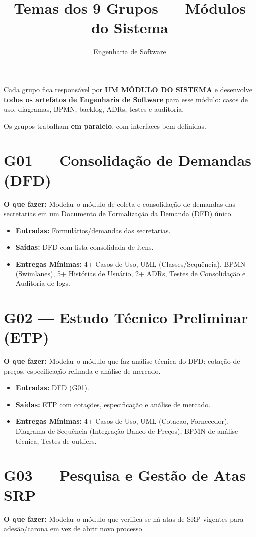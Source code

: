 \documentclass[a4paper,12pt]{article}
\title{Temas dos 9 Grupos --- Módulos do Sistema}
\author{Engenharia de Software}
\date{}
\begin{document}
\maketitle

\noindent Cada grupo fica responsável por \textbf{UM MÓDULO DO SISTEMA} e desenvolve \textbf{todos os artefatos de Engenharia de Software} para esse módulo: casos de uso, diagramas, BPMN, backlog, ADRs, testes e auditoria.

\noindent Os grupos trabalham \textbf{em paralelo}, com interfaces bem definidas.

\section*{G01 --- Consolidação de Demandas (DFD)}
\textbf{O que fazer:} Modelar o módulo de coleta e consolidação de demandas das secretarias em um Documento de Formalização da Demanda (DFD) único.

\begin{itemize}[leftmargin=*]
    \item \textbf{Entradas:} Formulários/demandas das secretarias.
    \item \textbf{Saídas:} DFD com lista consolidada de itens.
    \item \textbf{Entregas Mínimas:} 4+ Casos de Uso, UML (Classes/Sequência), BPMN (Swimlanes), 5+ Histórias de Usuário, 2+ ADRs, Testes de Consolidação e Auditoria de logs.
\end{itemize}

\section*{G02 --- Estudo Técnico Preliminar (ETP)}
\textbf{O que fazer:} Modelar o módulo que faz análise técnica do DFD: cotação de preços, especificação refinada e análise de mercado.

\begin{itemize}[leftmargin=*]
    \item \textbf{Entradas:} DFD (G01).
    \item \textbf{Saídas:} ETP com cotações, especificação e análise de mercado.
    \item \textbf{Entregas Mínimas:} 4+ Casos de Uso, UML (Cotacao, Fornecedor), Diagrama de Sequência (Integração Banco de Preços), BPMN de análise técnica, Testes de outliers.
\end{itemize}

\section*{G03 --- Pesquisa e Gestão de Atas SRP}
\textbf{O que fazer:} Modelar o módulo que verifica se há atas de SRP vigentes para adesão/carona em vez de abrir novo processo.
\end{document}
